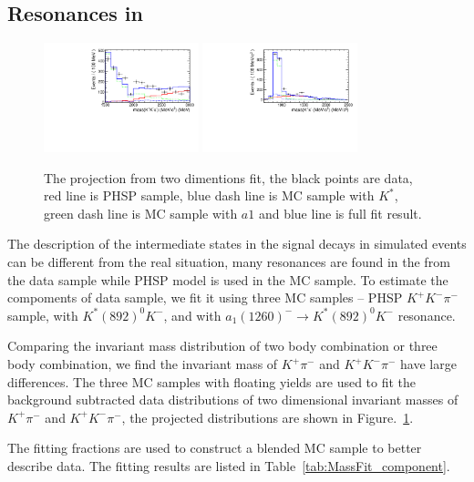 \subsection{Resonances in \LbLckkpi}
\label{sec:resonanceweight}

\begin{figure}[bth]
\centering
\includegraphics[width=0.4\textwidth]{Figures/05_open_charm/04_tune/component/LbKpKmPi.pdf}%
\includegraphics[width=0.4\textwidth]{Figures/05_open_charm/04_tune/component/LbKpPi.pdf}%
\caption{The projection from two dimentions fit, 
the black points are data, 
red line is PHSP sample, 
blue dash line is MC sample with $K^{*}$, 
green dash line is MC sample with $a1$ and blue line is full fit result.}
\label{Fig.Projection}
\end{figure}  

The description of the intermediate states in the signal \Lb decays in simulated events can be different from the real situation, 
many resonances are found in the \LbLckkpi from the data sample while PHSP model is used in the MC sample. 
To estimate the compoments of data sample, 
we fit it using three MC samples -- PHSP $K^+K^-\pi^-$ sample, 
with $K^{*}(892)^0K^-$, and with $a_1(1260)^-\to K^{*}(892)^0K^-$ resonance.  

Comparing the invariant mass distribution of two body combination or three body combination, 
we find the invariant mass of $K^+\pi^-$ and $K^+K^-\pi^-$ have large differences. 
The three MC samples with floating yields are used to fit the background subtracted data distributions 
of two dimensional invariant masses of $K^+\pi^-$ and $K^+K^-\pi^-$, 
the projected distributions are shown in Figure.~\ref{Fig.Projection}. 

The fitting fractions are used to construct a blended MC sample to better describe data.
The fitting results are listed in Table~\ref{tab:MassFit_component}.   


